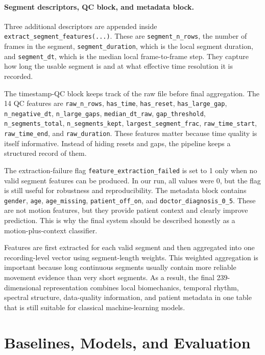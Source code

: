 \documentclass[10pt,twocolumn]{article}
\begin{document}
\paragraph{Segment descriptors, QC block, and metadata block.}
Three additional descriptors are appended inside \texttt{extract\_segment\_features(...)}. These are \texttt{segment\_n\_rows}, the number of frames in the segment, \texttt{segment\_duration}, which is the local segment duration, and \texttt{segment\_dt}, which is the median local frame-to-frame step. They capture how long the usable segment is and at what effective time resolution it is recorded.

The timestamp-QC block keeps track of the raw file before final aggregation. The 14 QC features are \texttt{raw\_n\_rows}, \texttt{has\_time}, \texttt{has\_reset}, \texttt{has\_large\_gap}, \texttt{n\_negative\_dt}, \texttt{n\_large\_gaps}, \texttt{median\_dt\_raw}, \texttt{gap\_threshold}, \texttt{n\_segments\_total}, \texttt{n\_segments\_kept}, \texttt{largest\_segment\_frac}, \texttt{raw\_time\_start}, \texttt{raw\_time\_end}, and \texttt{raw\_duration}. These features matter because time quality is itself informative. Instead of hiding resets and gaps, the pipeline keeps a structured record of them.

The extraction-failure flag \texttt{feature\_extraction\_failed} is set to 1 only when no valid segment features can be produced. In our run, all values were 0, but the flag is still useful for robustness and reproducibility. The metadata block contains \texttt{gender}, \texttt{age}, \texttt{age\_missing}, \texttt{patient\_off\_on}, and \texttt{doctor\_diagnosis\_0\_5}. These are not motion features, but they provide patient context and clearly improve prediction. This is why the final system should be described honestly as a motion-plus-context classifier.

Features are first extracted for each valid segment and then aggregated into one recording-level vector using segment-length weights. This weighted aggregation is important because long continuous segments usually contain more reliable movement evidence than very short segments. As a result, the final 239-dimensional representation combines local biomechanics, temporal rhythm, spectral structure, data-quality information, and patient metadata in one table that is still suitable for classical machine-learning models.

\section{Baselines, Models, and Evaluation}
\end{document}

